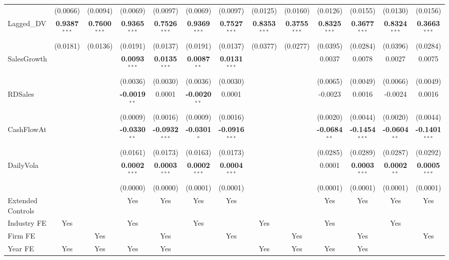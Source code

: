 \documentclass[11pt,a4paper]{article}
\begin{document}
\begin{table}[htbp]
\begin{tabular}{lcccccccccccc}
 & (0.0066) & (0.0094) & (0.0069) & (0.0097) & (0.0069) & (0.0097) & (0.0125) & (0.0160) & (0.0126) & (0.0155) & (0.0130) & (0.0156) \\
Lagged\_DV & \textbf{0.9387}$^{***}$ & \textbf{0.7600}$^{***}$ & \textbf{0.9365}$^{***}$ & \textbf{0.7526}$^{***}$ & \textbf{0.9369}$^{***}$ & \textbf{0.7527}$^{***}$ & \textbf{0.8353}$^{***}$ & \textbf{0.3755}$^{***}$ & \textbf{0.8325}$^{***}$ & \textbf{0.3677}$^{***}$ & \textbf{0.8324}$^{***}$ & \textbf{0.3663}$^{***}$ \\
 & (0.0181) & (0.0136) & (0.0191) & (0.0137) & (0.0191) & (0.0137) & (0.0377) & (0.0277) & (0.0395) & (0.0284) & (0.0396) & (0.0284) \\
SalesGrowth &  &  & \textbf{0.0093}$^{***}$ & \textbf{0.0135}$^{***}$ & \textbf{0.0087}$^{**}$ & \textbf{0.0131}$^{***}$ &  &  & 0.0037 & 0.0078 & 0.0027 & 0.0075 \\
 &  &  & (0.0036) & (0.0030) & (0.0036) & (0.0030) &  &  & (0.0065) & (0.0049) & (0.0066) & (0.0049) \\
RDSales &  &  & \textbf{-0.0019}$^{**}$ & 0.0001 & \textbf{-0.0020}$^{**}$ & 0.0001 &  &  & -0.0023 & 0.0016 & -0.0024 & 0.0016 \\
 &  &  & (0.0009) & (0.0016) & (0.0009) & (0.0016) &  &  & (0.0020) & (0.0044) & (0.0020) & (0.0044) \\
CashFlowAt &  &  & \textbf{-0.0330}$^{**}$ & \textbf{-0.0932}$^{***}$ & \textbf{-0.0301}$^{*}$ & \textbf{-0.0916}$^{***}$ &  &  & \textbf{-0.0684}$^{**}$ & \textbf{-0.1454}$^{***}$ & \textbf{-0.0604}$^{**}$ & \textbf{-0.1401}$^{***}$ \\
 &  &  & (0.0161) & (0.0173) & (0.0163) & (0.0173) &  &  & (0.0285) & (0.0289) & (0.0287) & (0.0292) \\
DailyVola &  &  & \textbf{0.0002}$^{***}$ & \textbf{0.0003}$^{***}$ & \textbf{0.0002}$^{***}$ & \textbf{0.0004}$^{***}$ &  &  & 0.0001 & \textbf{0.0003}$^{***}$ & \textbf{0.0002}$^{**}$ & \textbf{0.0005}$^{***}$ \\
 &  &  & (0.0000) & (0.0000) & (0.0001) & (0.0001) &  &  & (0.0001) & (0.0001) & (0.0001) & (0.0001) \\
\midrule
Extended Controls &  &  & Yes & Yes & Yes & Yes &  &  & Yes & Yes & Yes & Yes \\
Industry FE & Yes &  & Yes &  & Yes &  & Yes &  & Yes &  & Yes &  \\
Firm FE &  & Yes &  & Yes &  & Yes &  & Yes &  & Yes &  & Yes \\
Year FE & Yes & Yes & Yes & Yes &  &  & Yes & Yes & Yes & Yes &  &  \\

\end{tabular}
\end{table}
\end{document}
